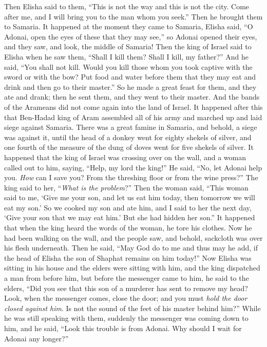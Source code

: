 \begin{biblechapter}
\verse Then Elisha said to them, “This is not the way and this is not the city. Come after me, and I will bring you to the man whom you seek.” Then he brought them to Samaria.
\verse It happened at the moment they came to Samaria, Elisha said, “O Adonai, open the eyes of these that they may see,” so Adonai opened their eyes, and they saw, and look, the middle of Samaria!
\verse Then the king of Israel said to Elisha when he saw them, “Shall I kill them? Shall I kill, my father?”
\verse And he said, “You shall not kill. Would you kill those whom you took captive with the sword or with the bow? Put food and water before them that they may eat and drink and then go to their master.”
\verse So he made a great feast for them, and they ate and drank; then he sent them, and they went to their master. And the bands of the Arameans did not come again into the land of Israel.
 It happened after this that Ben-Hadad king of Aram assembled all of his army and marched up and laid siege against Samaria.
\verse There was a great famine in Samaria, and behold, a siege was against it, until the head of a donkey went for eighty shekels of silver, and one fourth of the measure of the dung of doves went for five shekels of silver.
\verse It happened that the king of Israel was crossing over on the wall, and a woman called out to him, saying, “Help, my lord the king!”
\verse He said, “No, let Adonai help you. \textit{How} can I save you? From the threshing floor or from the wine press?”
\verse The king said to her, “\textit{What is the problem}?” Then the woman said, “This woman said to me, ‘Give me your son, and let us eat him today, then tomorrow we will eat my son.’
\verse So we cooked my son and ate him, and I said to her the next day, ‘Give your son that we may eat him.’ But she had hidden her son.”
\verse It happened that when the king heard the words of the woman, he tore his clothes. Now he had been walking on the wall, and the people saw, and behold, sackcloth was over his flesh underneath.
\verse Then he said, “May God do to me and thus may he add, if the head of Elisha the son of Shaphat remains on him today!”
\verse Now Elisha was sitting in his house and the elders were sitting with him, and the king dispatched a man from before him, but before the messenger came to him, he said to the elders, “Did you see that this son of a murderer has sent to remove my head? Look, when the messenger comes, close the door; and you must \textit{hold the door closed against him}. Is not the sound of the feet of his master behind him?”
\verse While he was still speaking with them, suddenly the messenger was coming down to him, and he said, “Look this trouble is from Adonai. Why should I wait for Adonai any longer?”
\end{biblechapter}


